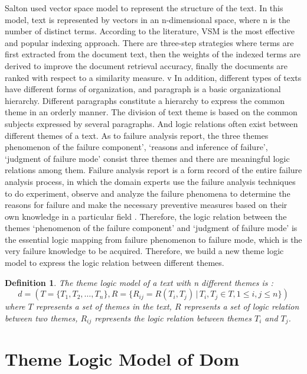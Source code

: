 \documentclass{elsarticle}
\newtheorem{definition}{Definition}
\begin{document}
Salton used vector space model to represent the structure of the
text. In this model, text is represented by vectors in an
n-dimensional space, where n is the number of distinct
terms. According to the literature, VSM is the most effective and
popular indexing approach. There are three-step strategies where terms
are first extracted from the document text, then the weights of the
indexed terms are derived to improve the document retrieval accuracy,
finally the documents are ranked with respect to a similarity measure.
v
In addition, different types of texts have different forms of
organization, and paragraph is a basic organizational
hierarchy. Different paragraphs constitute a hierarchy to express the
common theme in an orderly manner. The division of text theme is based
on the common subjects expressed by several paragraphs. And logic
relations often exist between different themes of a text. As to
failure analysis report, the three themes  phenomenon of the failure component’, ‘reasons and inference of failure’, ‘judgment of failure mode’ consist three themes and there are meaningful logic relations among them. Failure analysis report is a form record of the entire failure analysis process, in which the domain experts use the failure analysis techniques to do experiment, observe and analyze the failure phenomena to determine the reasons for failure and make the necessary preventive measures based on their own knowledge in a particular field \cite{roberts1980stm}. Therefore, the logic relation between the themes ‘phenomenon of the failure component’ and ‘judgment of failure mode’ is the essential logic mapping from failure phenomenon to failure mode, which is the very failure knowledge to be acquired. Therefore, we build a new theme logic model to express the logic relation between different themes.



\begin{definition}
  The theme logic model of a text with n different themes is :
\[ d = (T = \{T_1,T_2,\ldots,T_n\}, R = \{R_{ij} = R(T_i,T_j) \, | \, T_i,T_j \in
T,1\le i,j \le n \}) \]
where $T$ represents a set of themes in the text, $R$ represents a set of logic relation between two themes, $R_{ij}$ represents the logic relation between themes $T_i$ and $T_j$. 

\end{definition}

\section{Theme Logic Model of Dom
}
\label{sec:theme-logic-model}
\end{document}
